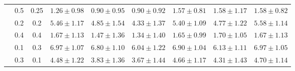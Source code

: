 \begin{tabular}{lcccccccc}
     & 0.5 & 0.25 & ${1.26\pm0.98}$ & ${0.90\pm0.95}$ & ${0.90\pm0.92}$ & ${1.57\pm0.81}$ & $\mathbf{1.58\pm1.17}$ & ${1.58\pm0.82}$ \\
     & 0.2 & 0.2 & ${5.46\pm1.17}$ & ${4.85\pm1.54}$ & ${4.33\pm1.37}$ & ${5.40\pm1.09}$ & ${4.77\pm1.22}$ & $\mathbf{5.58\pm1.14}$ \\
     & 0.4 & 0.4 & ${1.67\pm1.13}$ & ${1.47\pm1.36}$ & ${1.34\pm1.40}$ & ${1.65\pm0.99}$ & $\mathbf{1.70\pm1.05}$ & ${1.67\pm1.13}$ \\
     & 0.1 & 0.3 & $\mathbf{6.97\pm1.07}$ & ${6.80\pm1.10}$ & ${6.04\pm1.22}$ & ${6.90\pm1.04}$ & ${6.13\pm1.11}$ & ${6.97\pm1.05}$ \\
     & 0.3 & 0.1 & ${4.48\pm1.22}$ & ${3.83\pm1.36}$ & ${3.67\pm1.44}$ & ${4.66\pm1.17}$ & ${4.31\pm1.43}$ & $\mathbf{4.70\pm1.14}$ \\
  \bottomrule
\end{tabular}
